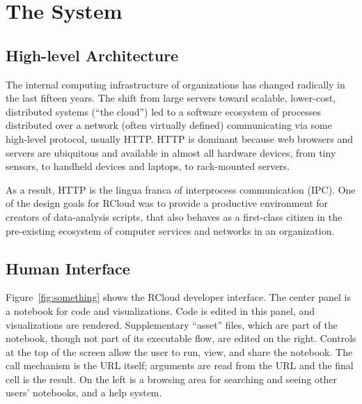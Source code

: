 \section{The System\label{sec:system}}

\subsection{High-level Architecture\label{sec:highlevelarchitecture}}


The internal computing infrastructure of organizations has changed
radically in the last fifteen years. The shift from large
servers toward scalable, lower-cost, distributed systems (``the cloud'')
led to a software ecosystem of processes distributed over a
network (often virtually defined) communicating via some
high-level protocol, usually HTTP. HTTP is dominant because web
browsers and servers are ubiquitous and available in almost
all hardware devices, from tiny sensors, to handheld devices and
laptops, to rack-mounted servers.

As a result, HTTP is the lingua franca of interprocess communication
(IPC). One of the design goals for RCloud was to provide a productive
environment for creators of data-analysis scripts, that also behaves
as a first-class citizen in the pre-existing ecosystem of computer
services and networks in an organization.


\subsection{Human Interface\label{sec:humaninterface}}


Figure~\ref{fig:something} shows the RCloud developer interface.
The center panel is a notebook for code and visualizations.
Code is edited in this panel, and visualizations are rendered.
Supplementary ``asset'' files, which are part of the notebook,
though not part of its executable flow, are edited on the right.
Controls at the top of the screen allow the user to run, view, and
share the notebook. The call mechanism is the URL itself; arguments are
read from the URL and the final cell is the result. On the left is a
browsing area for searching and seeing other users' notebooks, and a
help system.

